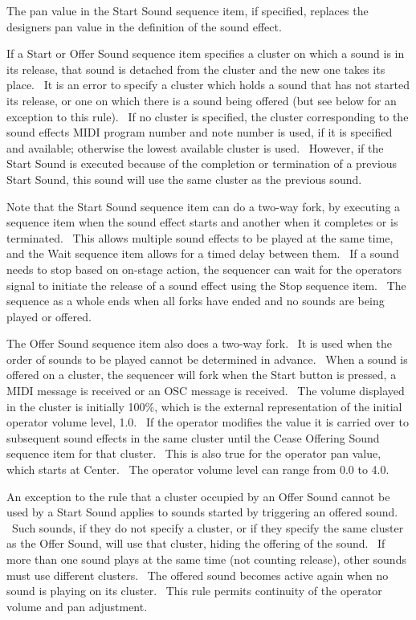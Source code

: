 \documentclass[letterpaper]{article}
\begin{document}
The pan value in the Start Sound sequence item, if specified, replaces
the designer{\textquotesingle}s pan value in the definition of the
sound effect.

If a Start or Offer Sound sequence item specifies a cluster on which a
sound is in its release, that sound is detached from the cluster and
the new one takes its place. \ It is an error to specify a cluster
which holds a sound that has not started its release, or one on which
there is a sound being offered (but see below for an exception to this
rule). \ If no cluster is specified, the cluster corresponding to the
sound effect{\textquotesingle}s MIDI program number and note number is
used, if it is specified and available; otherwise the lowest available
cluster is used. \ However, if the Start Sound is executed because of
the completion or termination of a previous Start Sound, this sound
will use the same cluster as the previous sound.

Note that the Start Sound sequence item can do a two-way fork, by
executing a sequence item when the sound effect starts and another when
it completes or is terminated. \ This allows multiple sound effects to
be played at the same time, and the Wait sequence item allows for a
timed delay between them. \ If a sound needs to stop based on on-stage
action, the sequencer can wait for the operator{\textquotesingle}s
signal to initiate the release of a sound effect using the Stop
sequence item. \ The sequence as a whole ends when all forks have ended
and no sounds are being played or offered.

The Offer Sound sequence item also does a two-way fork. \ It is used
when the order of sounds to be played cannot be determined in advance.
\ When a sound is offered on a cluster, the sequencer will fork when
the Start button is pressed, a MIDI message is received or an OSC
message is received. \ The volume displayed in the cluster is initially
100\%, which is the external representation of the initial operator
volume level, 1.0. \ If the operator modifies the value it is carried
over to subsequent sound effects in the same cluster until the Cease
Offering Sound sequence item for that cluster. \ This is also true for
the operator pan value, which starts at Center. \ The operator volume
level can range from 0.0 to 4.0.

An exception to the rule that a cluster occupied by an Offer Sound
cannot be used by a Start Sound applies to sounds started by triggering
an offered sound. \ Such sounds, if they do not specify a cluster, or
if they specify the same cluster as the Offer Sound, will use that
cluster, hiding the offering of the sound. \ If more than one sound
plays at the same time (not counting release), other sounds must use
different clusters. \ The offered sound becomes active again when no
sound is playing on its cluster. \ This rule permits continuity of the
operator volume and pan adjustment.
\end{document}
